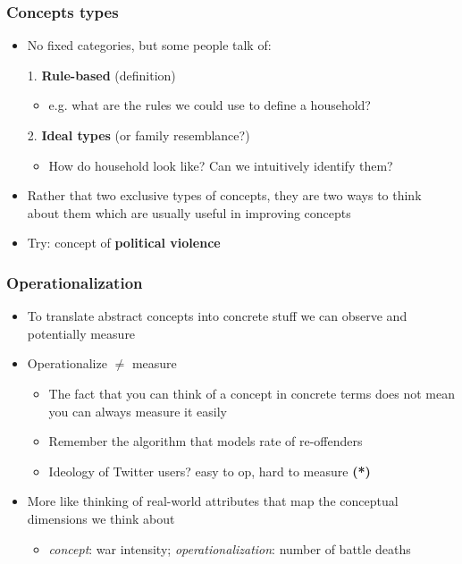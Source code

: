 \documentclass[aspectratio=43]{beamer}
\begin{document}
\begin{frame}
\frametitle{Concepts types}
\centering

\begin{itemize}
  \item No fixed categories, but some people talk of:
  \item[1.] \textbf{Rule-based} (definition)
  \begin{itemize}
    \item e.g. what are the rules we could use to define a household?
  \end{itemize}
  \item[2.] \textbf{Ideal types} (or family resemblance?)
  \begin{itemize}
    \item How do household look like? Can we intuitively identify them?
  \end{itemize}
  \item Rather that two exclusive types of concepts, they are two ways to think about them which are usually useful in improving concepts
  \item[]
  \item<2-> Try: concept of \textbf{political violence}
\end{itemize}

\end{frame}

\begin{frame}
\frametitle{Operationalization}
\centering

\begin{itemize}
  \item To translate abstract concepts into concrete stuff we can observe and potentially measure
  \item Operationalize $\neq$ measure
  \begin{itemize}
    \item The fact that you can think of a concept in concrete terms does not mean you can always measure it easily
    \item Remember the algorithm that models rate of re-offenders
    \item Ideology of Twitter users? easy to op, hard to measure \textbf{(*)}
  \end{itemize}
  \item<2-> More like thinking of real-world attributes that map the conceptual dimensions we think about
  \begin{itemize}
    \item \textit{concept}: war intensity; \textit{operationalization}: number of battle deaths
  \end{itemize}
\end{itemize}

\end{frame}
\end{document}

